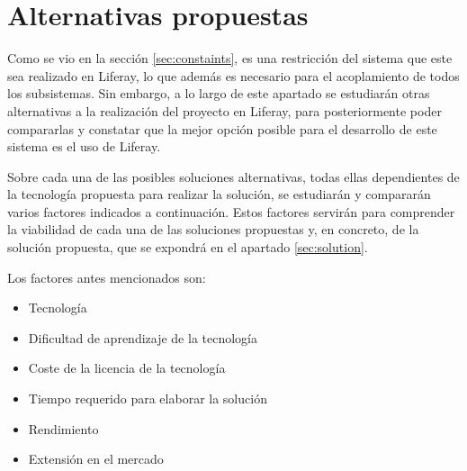 \section{Alternativas propuestas}

\par Como se vio en la sección \ref{sec:constaints}, es una restricción del sistema que este sea realizado en Liferay, lo que además es necesario para el acoplamiento de todos los subsistemas. Sin embargo, a lo largo de este apartado se estudiarán otras alternativas a la realización del proyecto en Liferay, para posteriormente poder compararlas y constatar que la mejor opción posible para el desarrollo de este sistema es el uso de Liferay.

\par Sobre cada una de las posibles soluciones alternativas, todas ellas dependientes de la tecnología propuesta para realizar la solución, se estudiarán y compararán varios factores indicados a continuación. Estos factores servirán para comprender la viabilidad de cada una de las soluciones propuestas y, en concreto, de la solución propuesta, que se expondrá en el apartado \ref{sec:solution}.

\par Los factores antes mencionados son:
\begin{itemize}
    \item Tecnología
    \item Dificultad de aprendizaje de la tecnología
    \item Coste de la licencia de la tecnología
    \item Tiempo requerido para elaborar la solución
    \item Rendimiento
    \item Extensión en el mercado
\end{itemize}
